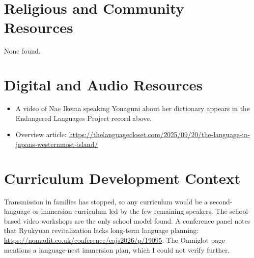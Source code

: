 \documentclass[12pt]{article}
\begin{document}
\section{Religious and Community Resources}
None found.

\section{Digital and Audio Resources}
\begin{itemize}
\item A video of Nae Ikema speaking Yonaguni about her dictionary appears in the Endangered Languages Project record above.
\item Overview article: \url{https://thelanguagecloset.com/2025/09/20/the-language-in-japans-westernmost-island/}
\end{itemize}

\section{Curriculum Development Context}
Transmission in families has stopped, so any curriculum would be a second-language or immersion curriculum led by the few remaining speakers. The school-based video workshops are the only school model found. A conference panel notes that Ryukyuan revitalization lacks long-term language planning: \url{https://nomadit.co.uk/conference/eajs2026/p/19095}. The Omniglot page mentions a language-nest immersion plan, which I could not verify further.
\end{document}
